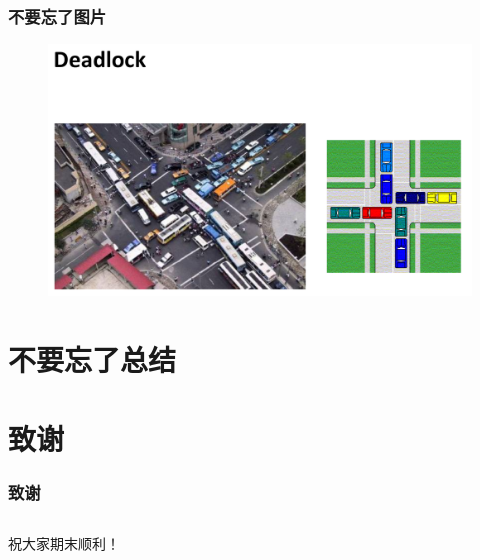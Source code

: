 \documentclass[AutoFakeBold]{beamer}
\begin{document}
{\begin{frame}
    \end{frame}

    \begin{frame}
        \frametitle{不要忘了图片}
    
        \begin{figure}
            \includegraphics[width=\textwidth]{figures/zlx3.png}
        \end{figure}
    
    \end{frame}

    \section{不要忘了总结}

    \section*{致谢}

    \begin{frame}
        \frametitle{致谢}
        \begin{columns}
            \begin{column}{.5\linewidth}
                \begin{center}
                    祝大家期末顺利！
                

\end{center}
\end{column}
\end{columns}
\end{frame}}
\end{document}

